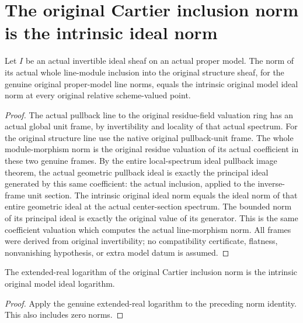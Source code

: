 \section{The original Cartier inclusion norm is the intrinsic ideal norm}

\begin{theorem}
\label{thm:actual-cartier-inclusion-model-norm}
\leanok
{}
Let $I$ be an actual invertible ideal sheaf on an actual proper
model. The norm of its actual whole line-module inclusion into the
original structure sheaf, for the genuine original proper-model
line norms, equals the intrinsic original model ideal norm at every
original relative scheme-valued point.
\end{theorem}
\begin{proof}
The actual pullback line to the original residue-field valuation
ring has an actual global unit frame, by invertibility and locality
of that actual spectrum. For the original structure line use the
native original pullback-unit frame. The whole module-morphism
norm is the original residue valuation of its actual coefficient
in these two genuine frames. By the entire local-spectrum ideal
pullback image theorem, the actual geometric pullback ideal is
exactly the principal ideal generated by this same coefficient:
the actual inclusion, applied to the inverse-frame unit section.
The intrinsic original ideal norm equals the ideal norm of that
entire geometric ideal at the actual center-section spectrum. The
bounded norm of its principal ideal is exactly the original value
of its generator. This is the same coefficient valuation which
computes the actual line-morphism norm. All frames were derived
from original invertibility; no compatibility certificate, flatness,
nonvanishing hypothesis, or extra model datum is assumed.
\end{proof}

\begin{corollary}
\label{cor:actual-cartier-inclusion-model-log}
\leanok
{}
The extended-real logarithm of the original Cartier inclusion norm
is the intrinsic original model ideal logarithm.
\end{corollary}
\begin{proof}
Apply the genuine extended-real logarithm to the preceding norm
identity. This also includes zero norms.
\end{proof}
